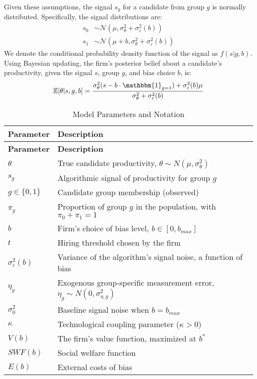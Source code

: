 Given these assumptions, the signal $s_g$ for a candidate from group $g$ is normally distributed. Specifically, the signal distributions are:
\begin{align*}
s_0 &\sim \mathcal{N}(\mu, \sigma_\theta^2 + \sigma_\varepsilon^2(b)) \\
s_1 &\sim \mathcal{N}(\mu + b, \sigma_\theta^2 + \sigma_\varepsilon^2(b))
\end{align*}
We denote the conditional probability density function of the signal as $f(s|g,b)$. Using Bayesian updating, the firm's posterior belief about a candidate's productivity, given the signal $s$, group $g$, and bias choice $b$, is:
\begin{equation}
\mathbb{E}[\theta|s, g, b] = \frac{\sigma_\theta^2(s - b \cdot \mathbbm{1}_{g=1}) + \sigma_\varepsilon^2(b)\mu}{\sigma_\theta^2 + \sigma_\varepsilon^2(b)}
\end{equation}

\begin{longtable}{@{}ll@{}}
\caption{Model Parameters and Notation}
\label{tab:params}\\
\toprule
\textbf{Parameter} & \textbf{Description} \\ \midrule
\endfirsthead
\toprule
\textbf{Parameter} & \textbf{Description} \\ \midrule
\endhead
\bottomrule
\endfoot
$\theta$ & True candidate productivity, $\theta \sim N(\mu, \sigma_\theta^2)$ \\
$s_g$ & Algorithmic signal of productivity for group $g$ \\
$g \in \{0,1\}$ & Candidate group membership (observed) \\
$\pi_g$ & Proportion of group $g$ in the population, with $\pi_0+\pi_1=1$ \\
$b$ & Firm's choice of bias level, $b \in [0, b_{max}]$ \\
$t$ & Hiring threshold chosen by the firm \\
$\sigma_\varepsilon^2(b)$ & Variance of the algorithm's signal noise, a function of bias \\
$\eta_g$ & Exogenous group-specific measurement error, $\eta_g \sim N(0, \sigma_{\eta,g}^2)$ \\
$\sigma_0^2$ & Baseline signal noise when $b=b_{max}$ \\
$\kappa$ & Technological coupling parameter ($\kappa>0$) \\
$V(b)$ & The firm's value function, maximized at $b^*$ \\
$SWF(b)$ & Social welfare function \\
$E(b)$ & External costs of bias \\
\end{longtable}


